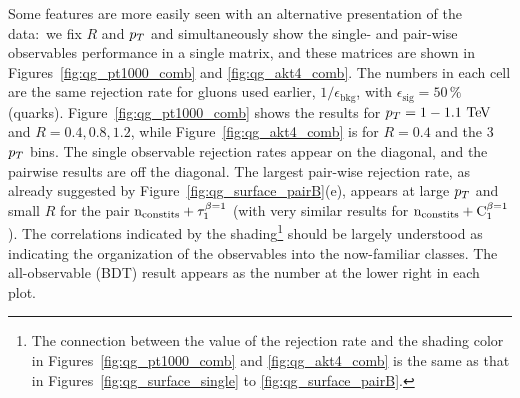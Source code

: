 Some features are more easily seen with an alternative presentation of the data:~we fix  $R$ and $p_T$ and simultaneously show the single- and pair-wise  observables performance in a single matrix, and these matrices are shown in Figures~\ref{fig:qg_pt1000_comb} and \ref{fig:qg_akt4_comb}.  
The numbers in each cell are the same rejection rate for gluons used earlier,
 $1/\epsilon_\text{bkg}$, with $\epsilon_\text{sig}= 50\,\% $ (quarks).  Figure~\ref{fig:qg_pt1000_comb} shows the results for $\pt=1-1.1 \TeV$ and
$R =0.4,0.8,1.2$, while  Figure~\ref{fig:qg_akt4_comb} is for $R = 0.4$ and the 3 $p_T$ bins.  The single observable rejection rates appear on the 
diagonal, and the pairwise results are off the diagonal.  The largest pair-wise rejection rate, as already suggested by Figure~\ref{fig:qg_surface_pairB}(e),
appears at large $p_T$ and small $R$ for the pair $\rm{n_ {\rm constits}}+ \tau_1^{\beta=1}$ 
(with very similar results for $\rm{n_ {\rm constits}}+ C_1^{\beta=1}$). 
The correlations indicated by the shading\footnote{The connection between the value of the rejection rate and the shading color in 
Figures~\ref{fig:qg_pt1000_comb} and \ref{fig:qg_akt4_comb} is the same as that in Figures~\ref{fig:qg_surface_single} to \ref{fig:qg_surface_pairB}.}   
should be largely understood as indicating the organization of the observables into the now-familiar
classes.  The all-observable (BDT) result appears as the number at the lower right in each plot.



